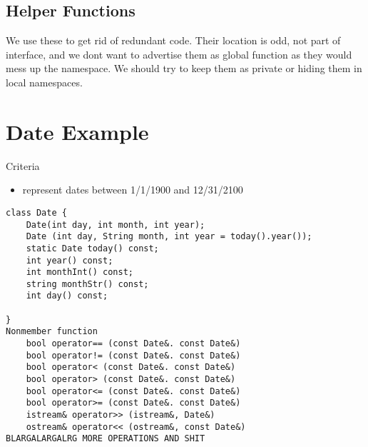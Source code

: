 \documentclass[12pt]{article}
\begin{document}
\subsection*{Helper Functions}
We use these to get rid of redundant code. Their location is odd, not part of interface, and we dont want to advertise them as global function as they would mess up the namespace. We should try to keep them as private or hiding them in local namespaces. 

\section*{Date Example}
Criteria
\begin{itemize}
\item represent dates between 1/1/1900 and 12/31/2100
\end{itemize}

\begin{verbatim}
class Date {
    Date(int day, int month, int year);
    Date (int day, String month, int year = today().year());
    static Date today() const;
    int year() const;
    int monthInt() const;
    string monthStr() const;
    int day() const;
    
}
Nonmember function
    bool operator== (const Date&. const Date&)
    bool operator!= (const Date&. const Date&)
    bool operator< (const Date&. const Date&)
    bool operator> (const Date&. const Date&)
    bool operator<= (const Date&. const Date&)
    bool operator>= (const Date&. const Date&)
    istream& operator>> (istream&, Date&)
    ostream& operator<< (ostream&, const Date&)
BLARGALARGALRG MORE OPERATIONS AND SHIT
\end{verbatim}
\end{document}
